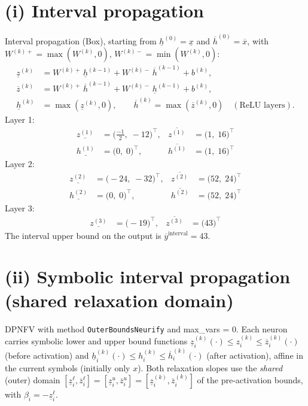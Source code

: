 \documentclass[11pt]{article}
\begin{document}
\section{(i) Interval propagation}
Interval propagation (Box), starting from $\underline{h}^{(0)} = \underline{x}$ and
$\overline{h}^{(0)} = \overline{x}$, with $W^{(k)+} = \max(W^{(k)}, 0)$,
$W^{(k)-} = \min(W^{(k)}, 0)$:
\begin{align*}
\underline{z}^{(k)} &= W^{(k)+}\, \underline{h}^{(k-1)} + W^{(k)-}\, \overline{h}^{(k-1)} + b^{(k)}, \\ 
\overline{z}^{(k)} &= W^{(k)+}\, \overline{h}^{(k-1)} + W^{(k)-}\, \underline{h}^{(k-1)} + b^{(k)}, \\ 
\underline{h}^{(k)} &= \max(\underline{z}^{(k)}, 0), \qquad \overline{h}^{(k)} = \max(\overline{z}^{(k)}, 0) \quad (\text{ReLU layers}).
\end{align*}
Layer 1:
\begin{align*}
\underline{z^{(1)}} &= \bigl(\frac{-1}{2},\; -12\bigr)^{\!\top}, & \overline{z^{(1)}} &= \bigl(1,\; 16\bigr)^{\!\top}
 \\
\underline{h^{(1)}} &= \bigl(0,\; 0\bigr)^{\!\top}, & \overline{h^{(1)}} &= \bigl(1,\; 16\bigr)^{\!\top}
\end{align*}
Layer 2:
\begin{align*}
\underline{z^{(2)}} &= \bigl(-24,\; -32\bigr)^{\!\top}, & \overline{z^{(2)}} &= \bigl(52,\; 24\bigr)^{\!\top}
 \\
\underline{h^{(2)}} &= \bigl(0,\; 0\bigr)^{\!\top}, & \overline{h^{(2)}} &= \bigl(52,\; 24\bigr)^{\!\top}
\end{align*}
Layer 3:
\begin{align*}
\underline{z^{(3)}} &= \bigl(-19\bigr)^{\!\top}, & \overline{z^{(3)}} &= \bigl(43\bigr)^{\!\top}
\end{align*}
The interval upper bound on the output is $\overline{y}^{\text{interval}} = 43$.

\section{(ii) Symbolic interval propagation (shared relaxation domain)}
DPNFV with method \texttt{OuterBoundsNeurify} and max\_vars = 0. Each neuron carries symbolic lower and upper bound functions
$\underline{z}^{(k)}_i(\cdot) \le z^{(k)}_i \le \overline{z}^{(k)}_i(\cdot)$ (before activation)
and $\underline{h}^{(k)}_i(\cdot) \le h^{(k)}_i \le \overline{h}^{(k)}_i(\cdot)$ (after activation),
affine in the current symbols (initially only $x$).
Both relaxation slopes use the \emph{shared} (outer) domain
$[\underline{z}^{\ell}_i, \overline{z}^{\ell}_i] = [\underline{z}^{u}_i, \overline{z}^{u}_i] = [\underline{z}^{(k)}_i, \overline{z}^{(k)}_i]$
of the pre-activation bounds, with $\beta_i = -\underline{z}^{\ell}_i$.
\end{document}
